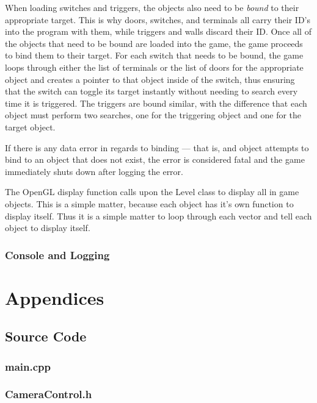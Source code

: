 \documentclass{article}
\begin{document}
When loading switches and triggers, the objects also need to be \emph{bound} to their appropriate target. This is why doors, switches, and terminals all carry their ID's into the program with them, while triggers and walls discard their ID. Once all of the objects that need to be bound are loaded into the game, the game proceeds to bind them to their target. For each switch that needs to be bound, the game loops through either the list of terminals or the list of doors for the appropriate object and creates a pointer to that object inside of the switch, thus ensuring that the switch can toggle its target instantly without needing to search every time it is triggered. The triggers are bound similar, with the difference that each object must perform two searches, one for the triggering object and one for the target object.

If there is any data error in regards to binding --- that is, and object attempts to bind to an object that does not exist, the error is considered fatal and the game immediately shuts down after logging the error.

The OpenGL display function calls upon the Level class to display all in game objects. This is a simple matter, because each object has it's own function to display itself. Thus it is a simple matter to loop through each vector and tell each object to display itself.

\subsubsection{Console and Logging}

\section{Appendices}

\subsection{Source Code}

\subsubsection{main.cpp}
	
 				
\subsubsection{CameraControl.h}
	
\end{document}
